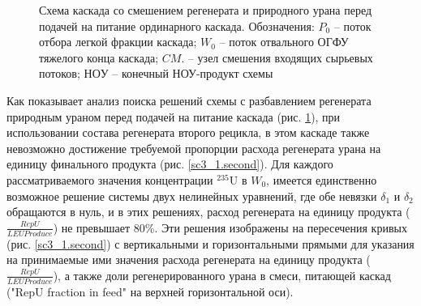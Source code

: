 \begin{figure}[ht]
  \caption{Схема каскада со смешением регенерата и природного урана перед подачей на питание ординарного каскада. Обозначения: $P_0$ -- поток отбора легкой фракции каскада; $W_0$ -- поток отвального ОГФУ тяжелого конца каскада; $CM.$ -- узел смешения входящих сырьевых потоков; $НОУ$ -- конечный НОУ-продукт схемы}\label{o3}
\end{figure}

Как показывает анализ поиска решений схемы с разбавлением регенерата природным ураном перед подачей на питание каскада (рис. \ref{o3}), при использовании состава регенерата второго рецикла, в этом каскаде также невозможно достижение требуемой пропорции расхода регенерата урана на единицу финального продукта (рис. \ref{sc3_1.second}). Для каждого рассматриваемого значения концентрации $^{235}$U в $W_0$, имеется единственно возможное решение системы двух нелинейных уравнений, где обе невязки $\delta_1$ и $\delta_2$  обращаются в нуль, и в этих решениях, расход регенерата на единицу продукта ($\frac{RepU}{LEU Produce}$) не превышает 80\%. Эти решения изображены на пересечения кривых (рис. \ref{sc3_1.second}) с вертикальными и горизонтальными прямыми для указания на принимаемые ими значения расхода регенерата на единицу продукта ($\frac{RepU}{LEU Produce}$), а также доли регенерированного урана в смеси, питающей каскад ("RepU fraction in feed" на верхней горизонтальной оси).



